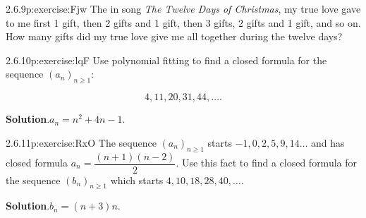 \documentclass[twoside,11pt,]{book}
\newcommand{\blocktitlefont}{\relax}
\numberwithin{equation}{chapter}
\begin{document}
\begin{divisionsolution}{2.6.9}{}{p:exercise:Fjw}%
The in song \emph{The Twelve Days of Christmas}, my true love gave to me first 1 gift, then 2 gifts and 1 gift, then 3 gifts, 2 gifts and 1 gift, and so on. How many gifts did my true love give me all together during the twelve days?%
\end{divisionsolution}%
\begin{divisionsolution}{2.6.10}{}{p:exercise:lqF}%
Use polynomial fitting to find a closed formula for the sequence \((a_n)_{n\ge 1}\text{:}\)%
\par
%
\begin{equation*}
4, 11, 20, 31, 44, \ldots
\text{.}
\end{equation*}
%
\par\smallskip%
\noindent\textbf{\blocktitlefont Solution}.\quad{}\(a_n = n^2 + 4n - 1\text{.}\)%
\end{divisionsolution}%
\begin{divisionsolution}{2.6.11}{}{p:exercise:RxO}%
The sequence \((a_n)_{n \ge 1}\) starts \(-1, 0, 2, 5, 9, 14\ldots\) and has closed formula \(a_n = \dfrac{(n+1)(n-2)}{2}\text{.}\) Use this fact to find a closed formula for the sequence \((b_n)_{n \ge 1}\) which starts \(4, 10, 18, 28, 40, \ldots\text{.}\)%
\par\smallskip%
\noindent\textbf{\blocktitlefont Solution}.\quad{}\(b_n = (n+3)n\text{.}\)%
\end{divisionsolution}%
\end{document}
